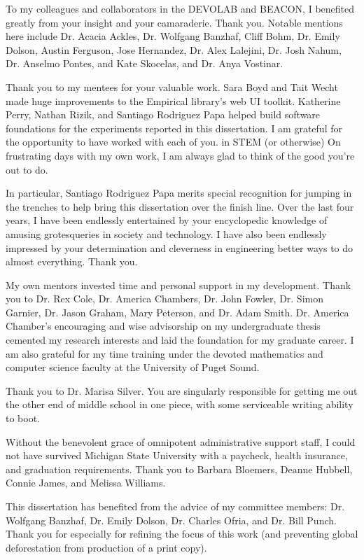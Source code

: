 To my colleagues and collaborators in the DEVOLAB and BEACON, I benefited greatly from your insight and your camaraderie.
Thank you.
Notable mentions here include Dr. Acacia Ackles, Dr. Wolfgang Banzhaf, Cliff Bohm, Dr. Emily Dolson, Austin Ferguson, Jose Hernandez, Dr. Alex Lalejini, Dr. Josh Nahum, Dr. Anselmo Pontes, and Kate Skocelas, and Dr. Anya Vostinar.

Thank you to my mentees for your valuable work.
Sara Boyd and Tait Wecht made huge improvements to the Empirical library's web UI toolkit.
Katherine Perry, Nathan Rizik, and Santiago Rodriguez Papa helped build software foundations for the experiments reported in this dissertation.
I am grateful for the opportunity to have worked with each of you.
in STEM (or otherwise)
On frustrating days with my own work, I am always glad to think of the good you're out to do.

In particular, Santiago Rodriguez Papa merits special recognition for jumping in the trenches to help bring this dissertation over the finish line.
Over the last four years, I have been endlessly entertained by your encyclopedic knowledge of amusing grotesqueries in society and technology.
I have also been endlessly impressed by your determination and cleverness in engineering better ways to do almost everything.
Thank you.

My own mentors invested time and personal support in my development.
Thank you to Dr. Rex Cole, Dr. America Chambers, Dr. John Fowler, Dr. Simon Garnier, Dr. Jason Graham, Mary Peterson, and Dr. Adam Smith.
Dr. America Chamber's encouraging and wise advisorship on my undergraduate thesis cemented my research interests and laid the foundation for my graduate career.
I am also grateful for my time training under the devoted mathematics and computer science faculty at the University of Puget Sound.

Thank you to Dr. Marisa Silver.
You are singularly responsible for getting me out the other end of middle school in one piece, with some serviceable writing ability to boot.

Without the benevolent grace of omnipotent administrative support staff, I could not have survived Michigan State University with a paycheck, health insurance, and graduation requirements.
Thank you to Barbara Bloemers, Deanne Hubbell, Connie James, and Melissa Williams.

This dissertation has benefited from the advice of my committee members: Dr. Wolfgang Banzhaf, Dr. Emily Dolson, Dr. Charles Ofria, and Dr. Bill Punch.
Thank you for especially for refining the focus of this work (and preventing global deforestation from production of a print copy).

